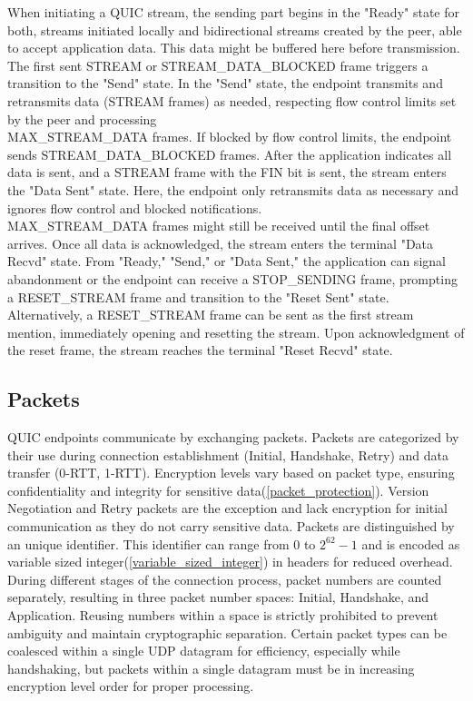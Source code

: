 When initiating a QUIC stream, the sending part begins in the "Ready" state for both, streams initiated locally and bidirectional streams created by the peer, able to accept application data. This data might be buffered here before transmission. The first sent STREAM or STREAM\_DATA\_BLOCKED frame triggers a transition to the "Send" state. In the "Send" state, the endpoint transmits and retransmits data (STREAM frames) as needed, respecting flow control limits set by the peer and processing \\ MAX\_STREAM\_DATA frames. If blocked by flow control limits, the endpoint sends STREAM\_DATA\_BLOCKED frames. After the application indicates all data is sent, and a STREAM frame with the FIN bit is sent, the stream enters the "Data Sent" state. Here, the endpoint only retransmits data as necessary and ignores flow control and blocked notifications. \\ MAX\_STREAM\_DATA frames might still be received until the final offset arrives. Once all data is acknowledged, the stream enters the terminal "Data Recvd" state. From "Ready," "Send," or "Data Sent," the application can signal abandonment or the endpoint can receive a STOP\_SENDING frame, prompting a RESET\_STREAM frame and transition to the "Reset Sent" state. Alternatively, a RESET\_STREAM frame can be sent as the first stream mention, immediately opening and resetting the stream. Upon acknowledgment of the reset frame, the stream reaches the terminal "Reset Recvd" state.

\subsection{Packets}

QUIC endpoints communicate by exchanging packets. Packets are categorized by their use during connection establishment (Initial, Handshake, Retry) and data transfer (0-RTT, 1-RTT). Encryption levels vary based on packet type, ensuring confidentiality and integrity for sensitive data(\ref{packet_protection}). Version Negotiation and Retry packets are the exception and lack encryption for initial communication as they do not carry sensitive data. Packets are distinguished by an unique identifier. This identifier can range from 0 to $2^{62}-1$  and is encoded as variable sized integer(\ref{variable_sized_integer}) in headers for reduced overhead. During different stages of the connection process, packet numbers are counted separately, resulting in three packet number spaces: Initial, Handshake, and Application. Reusing numbers within a space is strictly prohibited to prevent ambiguity and maintain cryptographic separation. Certain packet types can be coalesced within a single UDP datagram for efficiency, especially while handshaking, but packets within a single datagram must be in increasing encryption level order for proper processing.

